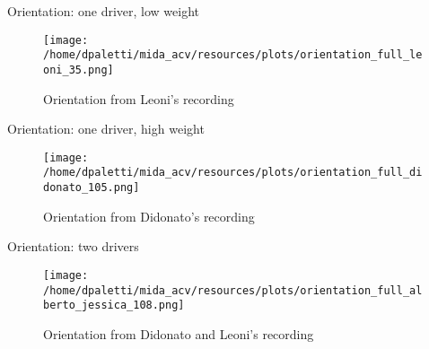 \documentclass[presentation]{beamer}
\begin{document}
\begin{frame}[label={sec:orgf3143cb}]{Orientation: one driver, low weight}
\begin{figure}[htbp]
\centering
\texttt{[image: /home/dpaletti/mida\_acv/resources/plots/orientation\_full\_leoni\_35.png]}
\caption{\label{fig:speed_jessica}Orientation from Leoni's recording}
\end{figure}
\end{frame}
\begin{frame}[label={sec:orge739d22}]{Orientation: one driver, high weight}
\begin{figure}[htbp]
\centering
\texttt{[image: /home/dpaletti/mida\_acv/resources/plots/orientation\_full\_didonato\_105.png]}
\caption{\label{fig:speed_jessica}Orientation from Didonato's recording}
\end{figure}
\end{frame}
\begin{frame}[label={sec:org6075863}]{Orientation: two drivers}
\begin{figure}[htbp]
\centering
\texttt{[image: /home/dpaletti/mida\_acv/resources/plots/orientation\_full\_alberto\_jessica\_108.png]}
\caption{\label{fig:speed_alberto_jessica}Orientation from Didonato and Leoni's recording}
\end{figure}
\end{frame}
\end{document}
